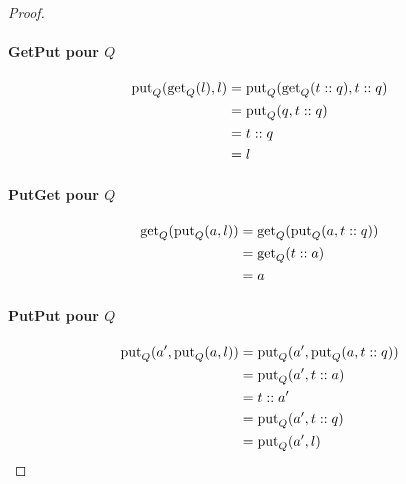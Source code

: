 \begin{proof}
\paragraph{GetPut pour $Q$}%

\begin{align*}
\mathrm{put}_{Q}(\mathrm{get}_{Q}(l), l) & = \mathrm{put}_{Q}(\mathrm{get}_{Q}(t::q), t::q) \\
                               & = \mathrm{put}_{Q}(q, t::q) \\
                               & = t::q \\
                               & = l \\
\end{align*}%

\paragraph{PutGet pour $Q$}%

\begin{align*}
\mathrm{get}_{Q}(\mathrm{put}_{Q}(a, l)) & = \mathrm{get}_{Q}(\mathrm{put}_{Q}(a, t::q)) \\
                               & = \mathrm{get}_{Q}(t::a) \\
                               & = a \\
\end{align*}%

\paragraph{PutPut pour $Q$}%

\begin{align*}
\mathrm{put}_{Q}(a', \mathrm{put}_{Q}(a, l)) & = \mathrm{put}_{Q}(a', \mathrm{put}_{Q}(a, t::q)) \\
                                   & = \mathrm{put}_{Q}(a', t::a) \\
                                   & = t::a' \\
                                   & = \mathrm{put}_{Q}(a', t::q) \\
                                   & = \mathrm{put}_{Q}(a', l) \\
\end{align*}%

\end{proof}%

